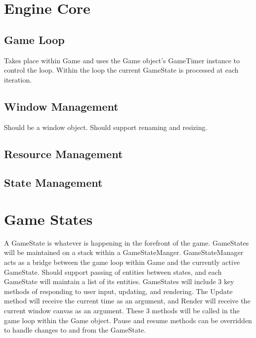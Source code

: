 \documentclass[12pt]{article}
\begin{document}
\section{	Engine Core}
\subsection{Game Loop}
Takes place within Game and uses the Game object's GameTimer instance to control the loop.  Within the loop the current GameState is processed at each iteration.

\subsection{Window Management}
Should be a window object.  Should support renaming and resizing.

\subsection{Resource Management}
		
\subsection{	State Management}
	
\section{	Game States}
A GameState is whatever is happening in the forefront of the game.  GameStates will be maintained on a stack within a GameStateManger.  GameStateManager acts as a bridge between the game loop within Game and the currently active GameState.  Should support passing of entities between states, and each GameState will maintain a list of its entities.  GameStates will include 3 key methods of responding to user input, updating, and rendering.  The Update method will receive the current time as an argument, and Render will receive the current window canvas as an argument.  These 3 methods will be called in the game loop within the Game object.  Pause and resume methods can be overridden to handle changes to and from the GameState.
\end{document}
